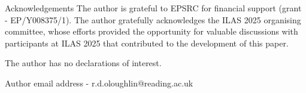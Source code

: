 \documentclass[12pt]{article}
\theoremstyle{plain}
\theoremstyle{definition}
\theoremstyle{remark}
\numberwithin{equation}{section}
\begin{document}



























\begin{section}{Acknowledgements}
     The author is grateful to EPSRC for financial support (grant - EP/Y008375/1).
      \newline
      The author gratefully acknowledges the ILAS 2025 organising committee, whose efforts provided the opportunity for valuable discussions with participants at ILAS 2025 that contributed to the development of this paper.

    \vskip 0.3cm

    \noindent The author has no declarations of interest.
\end{section}



 \noindent    Author email address - r.d.oloughlin@reading.ac.uk
\end{document}
